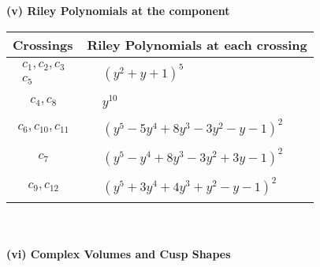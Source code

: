 \documentclass[1p]{elsarticle_modified}
\theoremstyle{definition}
\begin{document}
\newpage\renewcommand{\arraystretch}{1}
\flushleft \textbf{(v) Riley Polynomials at the component}\newline \\
\begin{tabular}{m{50pt}|m{274pt}}
Crossings & \hspace{64pt}Riley Polynomials at each crossing \\
\hline $$\begin{aligned}c_{1},c_{2},c_{3}\\c_{5}\end{aligned}$$&$\begin{aligned}
&(y^2+y+1)^5
\end{aligned}$\\
\hline $$\begin{aligned}c_{4},c_{8}\end{aligned}$$&$\begin{aligned}
&y^{10}
\end{aligned}$\\
\hline $$\begin{aligned}c_{6},c_{10},c_{11}\end{aligned}$$&$\begin{aligned}
&(y^5-5 y^4+8 y^3-3 y^2- y-1)^2
\end{aligned}$\\
\hline $$\begin{aligned}c_{7}\end{aligned}$$&$\begin{aligned}
&(y^5- y^4+8 y^3-3 y^2+3 y-1)^2
\end{aligned}$\\
\hline $$\begin{aligned}c_{9},c_{12}\end{aligned}$$&$\begin{aligned}
&(y^5+3 y^4+4 y^3+y^2- y-1)^2
\end{aligned}$\\
\hline
\end{tabular}\\~\\
\newpage\flushleft \textbf{(vi) Complex Volumes and Cusp Shapes}
\end{document}

